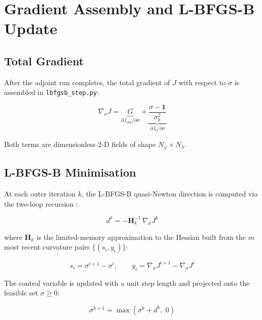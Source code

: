 \documentclass[12pt]{article}
\begin{document}
\section{Gradient Assembly and L-BFGS-B Update}

\subsection{Total Gradient}

After the adjoint run completes, the total gradient of $J$ with respect to
$\sigma$ is assembled in \texttt{lbfgsb\_step.py}:

\begin{equation}
  \nabla_\sigma J = \underbrace{G}_{\partial J_{\mathrm{obs}}/\partial \sigma}
                  + \underbrace{\frac{\sigma - \mathbf{1}}{\sigma_b^2}}_{\partial J_b/\partial \sigma}
  \label{eq:grad_total}
\end{equation}

Both terms are dimensionless 2-D fields of shape $N_\varphi \times N_\lambda$.

\subsection{L-BFGS-B Minimisation}

At each outer iteration $k$, the L-BFGS-B quasi-Newton direction is computed
via the two-loop recursion \cite{liu1989limited}:

\begin{equation}
  d^k = -\mathbf{H}_k^{-1}\,\nabla_\sigma J^k
  \label{eq:direction}
\end{equation}

where $\mathbf{H}_k$ is the limited-memory approximation to the Hessian built
from the $m$ most recent curvature pairs $\{(s_i, y_i)\}$:

\begin{equation}
  s_i = \sigma^{i+1} - \sigma^i, \qquad
  y_i = \nabla_\sigma J^{i+1} - \nabla_\sigma J^i
\end{equation}

The control variable is updated with a unit step length and projected onto the
feasible set $\sigma \ge 0$:

\begin{equation}
  \sigma^{k+1} = \max\!\left(\sigma^k + d^k,\; 0\right)
  \label{eq:update}
\end{equation}
\end{document}
